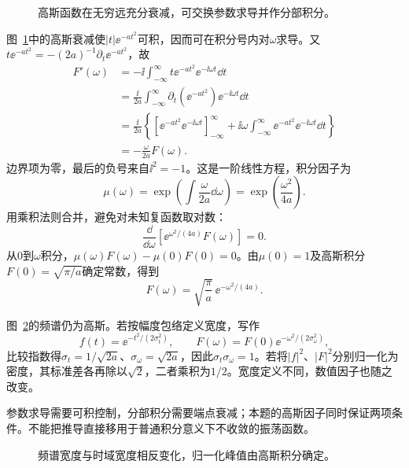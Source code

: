 \begin{figure}[H]\centering
{}
\caption{高斯函数在无穷远充分衰减，可交换参数求导并作分部积分。}\label{fig:c4-h14-q}
\end{figure}
\begin{solution}
图~\ref{fig:c4-h14-q}中的高斯衰减使$|t|\ee^{-at^2}$可积，因而可在积分号内对$\omega$求导。又$t\ee^{-at^2}=-(2a)^{-1}\partial_t\ee^{-at^2}$，故
\[\begin{aligned}
F'(\omega)&=-\ii\int_{-\infty}^{\infty}t\ee^{-at^2}\ee^{-\ii\omega t}\dd t\\
&=\frac{\ii}{2a}\int_{-\infty}^{\infty}\partial_t(\ee^{-at^2})\ee^{-\ii\omega t}\dd t\\
&=\frac{\ii}{2a}\left\{
\left[\ee^{-at^2}\ee^{-\ii\omega t}\right]_{-\infty}^{\infty}
+\ii\omega\int_{-\infty}^{\infty}\ee^{-at^2}\ee^{-\ii\omega t}\dd t\right\}\\
&=-\frac\omega{2a}F(\omega).
\end{aligned}\]
边界项为零，最后的负号来自$\ii^2=-1$。这是一阶线性方程，积分因子为
\[\mu(\omega)=\exp\left(\int\frac\omega{2a}\dd\omega\right)
=\exp\left(\frac{\omega^2}{4a}\right).\]
用乘积法则合并，避免对未知复函数取对数：
\[\frac{\dd}{\dd\omega}\left[\ee^{\omega^2/(4a)}F(\omega)\right]=0.
\]
从$0$到$\omega$积分，$\mu(\omega)F(\omega)-\mu(0)F(0)=0$。由$\mu(0)=1$及高斯积分$F(0)=\sqrt{\pi/a}$确定常数，得到
\[\boxed{F(\omega)=\sqrt{\frac\pi a}\,\ee^{-\omega^2/(4a)}}.\]

图~\ref{fig:c4-h14-s}的频谱仍为高斯。若按幅度包络定义宽度，写作
\[f(t)=\ee^{-t^2/(2\sigma_t^2)},\qquad
F(\omega)=F(0)\ee^{-\omega^2/(2\sigma_\omega^2)},\]
比较指数得$\sigma_t=1/\sqrt{2a}$、$\sigma_\omega=\sqrt{2a}$，因此$\sigma_t\sigma_\omega=1$。若将$|f|^2$、$|F|^2$分别归一化为密度，其标准差各再除以$\sqrt2$，二者乘积为$1/2$。宽度定义不同，数值因子也随之改变。

参数求导需要可积控制，分部积分需要端点衰减；本题的高斯因子同时保证两项条件。不能把推导直接移用于普通积分意义下不收敛的振荡函数。

\begin{figure}[H]\centering
{}
\caption{频谱宽度与时域宽度相反变化，归一化峰值由高斯积分确定。}\label{fig:c4-h14-s}
\end{figure}
\end{solution}

